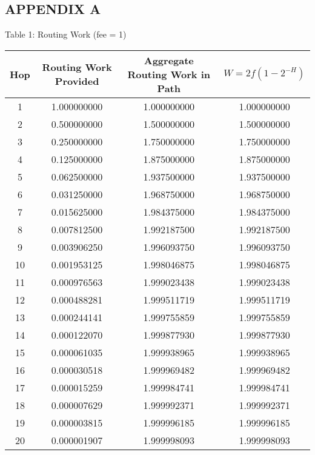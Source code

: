 \documentclass[oneside]{article}   	%
\begin{document}
\pagebreak



\pagebreak
\subsection*{APPENDIX A}

\bigskip 
\bigskip 

\begin{center}
Table 1: Routing Work (fee = 1)

\bigskip

\begin{tabular}{ |c|c|c|c| } 
 \hline
 Hop & Routing Work Provided & Aggregate Routing Work in Path & \begin{math}W = 2f\left(1-2^{-H}\right)\end{math} \\
 \hline
1 & 
1.000000000 & 
1.000000000 & 
1.000000000 \\
2 & 
0.500000000 & 
1.500000000 & 
1.500000000 \\
3 & 
0.250000000 & 
1.750000000 & 
1.750000000 \\
4 & 
0.125000000 & 
1.875000000 & 
1.875000000 \\
5 & 
0.062500000 & 
1.937500000 & 
1.937500000 \\
6 & 
0.031250000 & 
1.968750000 & 
1.968750000 \\
7 & 
0.015625000 & 
1.984375000 & 
1.984375000 \\
8 & 
0.007812500 & 
1.992187500 & 
1.992187500 \\
9 & 
0.003906250 & 
1.996093750 & 
1.996093750 \\
10 & 
0.001953125 & 
1.998046875 & 
1.998046875 \\
11 & 
0.000976563 & 
1.999023438 & 
1.999023438 \\
12 & 
0.000488281 & 
1.999511719 & 
1.999511719 \\
13 & 
0.000244141 & 
1.999755859 & 
1.999755859 \\
14 & 
0.000122070 & 
1.999877930 & 
1.999877930 \\
15 & 
0.000061035 & 
1.999938965 & 
1.999938965 \\
16 & 
0.000030518 & 
1.999969482 & 
1.999969482 \\
17 & 
0.000015259 & 
1.999984741 & 
1.999984741 \\
18 & 
0.000007629 & 
1.999992371 & 
1.999992371 \\
19 & 
0.000003815 & 
1.999996185 & 
1.999996185 \\
20 & 
0.000001907 & 
1.999998093 & 
1.999998093 \\
 \hline
\end{tabular}
\end{center}
\end{document}
